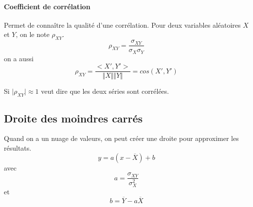 \documentclass[10pt,a4paper,french]{article}
\begin{document}
\paragraph{Coefficient de corrélation}
Permet de connaître la qualité d'une corrélation. Pour deux variables aléatoires $X$ et $Y$, on le note $\rho_{X Y}$.
\[ \rho_{X Y} = \frac{\sigma_{X Y}}{\sigma_X \sigma_Y} \]
on a aussi \[ \rho_{X Y} = \frac{<X', Y'>}{\Vert X \Vert \Vert Y \Vert} = cos(X', Y') \]

Si $\vert \rho_{X Y} \vert \approx 1$ veut dire que les deux séries sont corrélées.

\subsection{Droite des moindres carrés}

Quand on a un nuage de valeurs, on peut créer une droite pour approximer les résultats.
\[ y = a (x - \overline{X}) + b \]
avec \[ a = \frac{\sigma_{X Y}}{\sigma_X^2} \]
et \[ b = \overline{Y} - a \overline{X} \]
\end{document}
